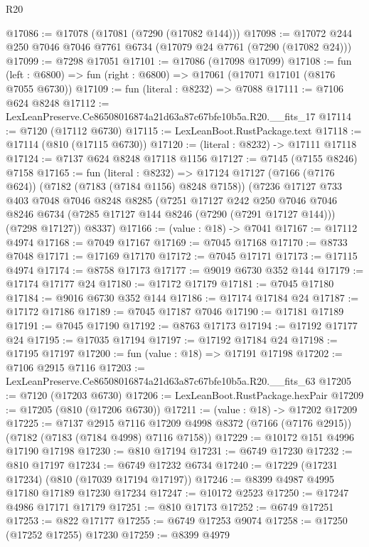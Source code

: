 \begin{lexlean}{R20}
\begin{coremodule}
{@17086 := @17078 (@17081 (@7290 (@17082 @144)))
@17098 := @17072 @244 @250 @7046 @7046 @7761 @6734 (@17079 @24 @7761 (@7290 (@17082 @24)))
@17099 := @7298 @17051
@17101 := @17086 (@17098 @17099)
@17108 := fun (left : @6800) => fun (right : @6800) => @17061 (@17071 @17101 (@8176 @7055 @6730))
@17109 := fun (literal : @8232) => @7088
@17111 := @7106 @624 @8248
@17112 := LexLeanPreserve.Ce86508016874a21d63a87c67bfe10b5a.R20.__fits_17
@17114 := @7120 (@17112 @6730)
@17115 := LexLeanBoot.RustPackage.text
@17118 := @17114 (@810 (@17115 @6730))
@17120 := (literal : @8232) -> @17111 @17118
@17124 := @7137 @624 @8248 @17118 @1156
@17127 := @7145 (@7155 @8246) @7158
@17165 := fun (literal : @8232) =>
  @17124
    @17127
    (@7166 (@7176 @624))
    (@7182 (@7183 (@7184 @1156) @8248 @7158))
    (@7236
      @17127
      @733
      @403
      @7048
      @7046
      @8248
      @8285
      (@7251
        @17127
        @242
        @250
        @7046
        @7046
        @8246
        @6734
        (@7285 @17127 @144 @8246 (@7290 (@7291 @17127 @144)))
        (@7298 @17127))
      @8337)
@17166 := (value : @18) -> @7041
@17167 := @17112 @4974
@17168 := @7049 @17167
@17169 := @7045 @17168
@17170 := @8733 @7048
@17171 := @17169 @17170
@17172 := @7045 @17171
@17173 := @17115 @4974
@17174 := @8758 @17173
@17177 := @9019 @6730 @352 @144
@17179 := @17174 @17177 @24
@17180 := @17172 @17179
@17181 := @7045 @17180
@17184 := @9016 @6730 @352 @144
@17186 := @17174 @17184 @24
@17187 := @17172 @17186
@17189 := @7045 @17187 @7046
@17190 := @17181 @17189
@17191 := @7045 @17190
@17192 := @8763 @17173
@17194 := @17192 @17177 @24
@17195 := @17035 @17194
@17197 := @17192 @17184 @24
@17198 := @17195 @17197
@17200 := fun (value : @18) => @17191 @17198
@17202 := @7106 @2915 @7116
@17203 := LexLeanPreserve.Ce86508016874a21d63a87c67bfe10b5a.R20.__fits_63
@17205 := @7120 (@17203 @6730)
@17206 := LexLeanBoot.RustPackage.hexPair
@17209 := @17205 (@810 (@17206 @6730))
@17211 := (value : @18) -> @17202 @17209
@17225 := @7137
    @2915
    @7116
    @17209
    @4998
    @8372
    (@7166 (@7176 @2915))
    (@7182 (@7183 (@7184 @4998) @7116 @7158))
@17229 := @10172 @151 @4996 @17190 @17198
@17230 := @810 @17194
@17231 := @6749 @17230
@17232 := @810 @17197
@17234 := @6749 @17232 @6734
@17240 := @17229 (@17231 @17234) (@810 (@17039 @17194 @17197))
@17246 := @8399 @4987 @4995 @17180 @17189 @17230 @17234
@17247 := @10172 @2523
@17250 := @17247 @4986 @17171 @17179
@17251 := @810 @17173
@17252 := @6749 @17251
@17253 := @822 @17177
@17255 := @6749 @17253 @9074
@17258 := @17250 (@17252 @17255) @17230
@17259 := @8399 @4979
}
\end{coremodule}
\end{lexlean}

